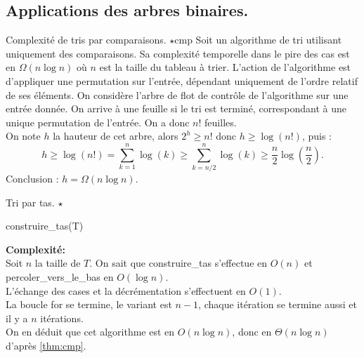 \documentclass[french, 11pt]{article}
\begin{document}
\pagebreak 

\subsection{Applications des arbres binaires.}

\begin{thm}{Complexité de tris par comparaisons. $\star$}{cmp}
    Soit un algorithme de tri utilisant uniquement des comparaisons. Sa complexité temporelle dans le pire des cas est en $\Omega(n\log n)$ où $n$ est la taille du tableau à trier.
    \tcblower
    L'action de l'algorithme est d'appliquer une permutation sur l'entrée, dépendant uniquement de l'ordre relatif de ses éléments.
    On considère l'arbre de flot de contrôle de l'algorithme sur une entrée donnée. On arrive à une feuille si le tri est terminé, correspondant à une unique permutation de l'entrée. On a donc $n!$ feuilles.\\
    On note $h$ la hauteur de cet arbre, alors $2^h \geq n!$ donc $h\geq\log(n!)$, puis :
    \begin{equation*}
        h\geq\log(n!)=\sum_{k=1}^n\log(k)\geq\sum_{k=n/2}^n\log(k)\geq\frac{n}{2}\log\left(\frac{n}{2}\right).
    \end{equation*}
    Conclusion : $h=\Omega(n\log n)$.
\end{thm}

\begin{defi}{Tri par tas. $\star$}{}
    \begin{algorithm}[H]
        \caption{Tri par tas}
        construire\_tas(T)\\
    \end{algorithm}
    \textbf{Complexité:}\\
    Soit $n$ la taille de $T$. On sait que construire\_tas s'effectue en $O(n)$ et percoler\_vers\_le\_bas en $O(\log n)$.\\
    L'échange des cases et la décrémentation s'effectuent en $O(1)$.\\
    La boucle for se termine, le variant est $n-1$, chaque itération se termine aussi et il y a $n$ itérations.\\
    On en déduit que cet algorithme est en $O(n\log n)$, donc en $\Theta(n\log n)$ d'après \ref{thm:cmp}.
\end{defi}
\end{document}
